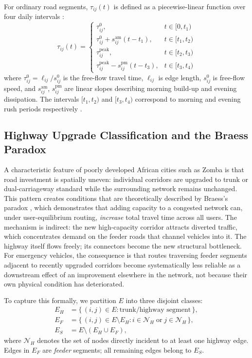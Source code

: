 \documentclass[paper=A4, 12pt, mathscr]{report}
\begin{document}
	For ordinary road segments, $\tau_{ij}(t)$ is defined as a
	piecewise-linear function over four daily intervals
	\cite{13,humagain}:
	\begin{equation}
		\tau_{ij}(t)=
		\begin{cases}
			\tau_{ij}^0, & t\in[0,t_1) \\[2pt]
			\tau_{ij}^0 + s_{ij}^{\mathrm{am}}(t-t_1), & t\in[t_1,t_2) \\[2pt]
			\tau_{ij}^{\mathrm{peak}}, & t\in[t_2,t_3) \\[2pt]
			\tau_{ij}^{\mathrm{peak}} - s_{ij}^{\mathrm{pm}}(t-t_3),
			& t\in[t_3,t_4)
		\end{cases}
		\label{eq:tauij}
	\end{equation}
	where $\tau_{ij}^0 = \ell_{ij}/s_{ij}^0$ is the free-flow travel time,
	$\ell_{ij}$ is edge length, $s_{ij}^0$ is free-flow speed, and
	$s_{ij}^{\mathrm{am}}$, $s_{ij}^{\mathrm{pm}}$ are linear slopes
	describing morning build-up and evening dissipation. The intervals
	$[t_1,t_2)$ and $[t_3,t_4)$ correspond to morning and evening rush
	periods respectively \cite{13}.
	
	\subsection*{Highway Upgrade Classification and the Braess Paradox}
	
	A characteristic feature of poorly developed African cities such as Zomba
	is that road investment is spatially uneven: individual corridors are
	upgraded to trunk or dual-carriageway standard while the surrounding
	network remains unchanged. This pattern creates conditions that are
	theoretically described by Braess's paradox \cite{braess1968}, which
	demonstrates that adding capacity to a congested network can, under
	user-equilibrium routing, \textit{increase} total travel time across all
	users. The mechanism is indirect: the new high-capacity corridor attracts
	diverted traffic, which concentrates demand on the feeder roads that
	channel vehicles into it. The highway itself flows freely; its connectors
	become the new structural bottleneck. For emergency vehicles, the
	consequence is that routes traversing feeder segments adjacent to recently
	upgraded corridors become systematically less reliable as a downstream
	effect of an improvement elsewhere in the network, not because their own
	physical condition has deteriorated.
	
	To capture this formally, we partition $E$ into three disjoint classes:
	\begin{align}
		E_H &= \{\,(i,j)\in E : \text{trunk/highway segment}\,\},
		\nonumber\\
		E_F &= \{\,(i,j)\in E\setminus E_H :
		i\in\mathcal{N}_H \;\text{or}\; j\in\mathcal{N}_H\,\},
		\nonumber\\
		E_S &= E\setminus(E_H\cup E_F),
		\nonumber
	\end{align}
	where $\mathcal{N}_H$ denotes the set of nodes directly incident to at
	least one highway edge. Edges in $E_F$ are \textit{feeder} segments;
	all remaining edges belong to $E_S$.
	
\end{document}
